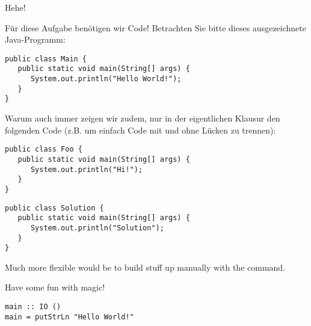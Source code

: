 \begin{exercise}[5]{Hehe!}
\label{ex:second}%

Für diese Aufgabe benötigen wir Code!
Betrachten Sie bitte dieses ausgezeichnete Java-Programm:

\begin{verbatim}
public class Main {
   public static void main(String[] args) {
      System.out.println("Hello World!");
   }
}
\end{verbatim}

\begin{examonly}
Warum auch immer zeigen wir zudem, nur in der eigentlichen Klausur den folgenden Code (z.B. um einfach Code mit und ohne Lücken zu trennen):
\begin{verbatim}
public class Foo {
   public static void main(String[] args) {
      System.out.println("Hi!");
   }
}
\end{verbatim}
\bigskip

\CodeLines{9cm}
\end{examonly}

\begin{solution}
\begin{verbatim}
public class Solution {
   public static void main(String[] args) {
      System.out.println("Solution");
   }
}
\end{verbatim}
\end{solution}

Much more flexible would be to build stuff up manually with the \string\ifinmode\space command.

\begin{solutionbox}
   Have some fun with magic!

\begin{verbatim}
main :: IO ()
main = putStrLn "Hello World!"
\end{verbatim}
\end{solutionbox}
\fi

\end{exercise}

